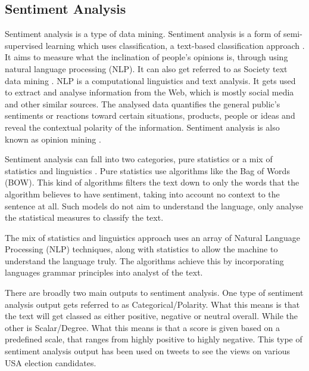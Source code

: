 \documentclass[a4paper,10pt]{article}
\begin{document}
\subsection{Sentiment Analysis}
Sentiment analysis is a type of data mining. Sentiment analysis is a form of semi-supervised learning \cite{intro2datamining book} which uses classification, a text-based classification approach \cite{jjslidesNLP}. It aims to measure what the inclination of people's opinions is, through using natural language processing (NLP). It can also get referred to as Society text data mining \cite{jjslideNLP}. NLP is a computational linguistics and text analysis. It gets used to extract and analyse information from the Web, which is mostly social media and other similar sources. The analysed data quantifies the general public's sentiments or reactions toward certain situations, products, people or ideas and reveal the contextual polarity of the information. Sentiment analysis is also known as opinion mining \cite{towarddatasciencesentiment}.

Sentiment analysis can fall into two categories, pure statistics or a mix of statistics and linguistics \cite{towarddatasciencesentiment}. Pure statistics use algorithms like the Bag of Words (BOW). This kind of algorithms filters the text down to only the words that the algorithm believes to have sentiment, taking into account no context to the sentence at all. Such models do not aim to understand the language, only analyse the statistical measures to classify the text. 

The mix of statistics and linguistics approach uses an array of Natural Language Processing (NLP) techniques, along with statistics to allow the machine to understand the language truly. The algorithms achieve this by incorporating languages grammar principles into analyst of the text. 

There are broadly two main outputs to sentiment analysis. One type of sentiment analysis output gets referred to as Categorical/Polarity. What this means is that the text will get classed as either positive, negative or neutral overall. While the other is Scalar/Degree. What this means is that a score is given based on a predefined scale, that ranges from highly positive to highly negative. This type of sentiment analysis output has been used on tweets to see the views on various USA election candidates.

\end{document}
